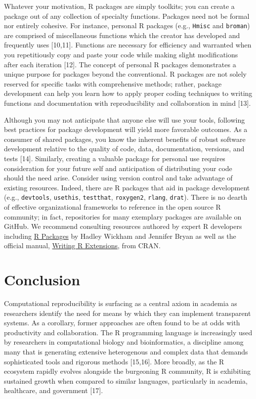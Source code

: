 \documentclass[10pt,letterpaper]{article}
\begin{document}
Whatever your motivation, R packages are simply toolkits; you can create
a package out of any collection of specialty functions. Packages need
not be formal nor entirely cohesive. For instance, personal R packages
(e.g., \texttt{Hmisc} and \texttt{broman}) are comprised of
miscellaneous functions which the creator has developed and frequently
uses {[}10,11{]}. Functions are necessary for efficiency and warranted
when you repetitiously copy and paste your code while making slight
modifications after each iteration {[}12{]}. The concept of personal R
packages demonstrates a unique purpose for packages beyond the
conventional. R packages are not solely reserved for specific tasks with
comprehensive methods; rather, package development can help you learn
how to apply proper coding techniques to writing functions and
documentation with reproducibility and collaboration in mind {[}13{]}.

Although you may not anticipate that anyone else will use your tools,
following best practices for package development will yield more
favorable outcomes. As a consumer of shared packages, you know the
inherent benefits of robust software development relative to the quality
of code, data, documentation, versions, and tests {[}14{]}. Similarly,
creating a valuable package for personal use requires consideration for
your future self and anticipation of distributing your code should the
need arise. Consider using version control and take advantage of
existing resources. Indeed, there are R packages that aid in package
development (e.g., \texttt{devtools}, \texttt{usethis},
\texttt{testthat}, \texttt{roxygen2}, \texttt{rlang}, \texttt{drat}).
There is no dearth of effective organizational frameworks to reference
in the open source R community; in fact, repositories for many exemplary
packages are available on GitHub. We recommend consulting resources
authored by expert R developers including \href{https://r-pkgs.org/}{R
Packages} by Hadley Wickham and Jennifer Bryan as well as the official
manual,
\href{https://cran.r-project.org/doc/manuals/r-release/R-exts.html}{Writing
R Extensions}, from CRAN.

\hypertarget{conclusion}{%
\section{Conclusion}\label{conclusion}}

Computational reproducibility is surfacing as a central axiom in
academia as researchers identify the need for means by which they can
implement transparent systems. As a corollary, former approaches are
often found to be at odds with productivity and collaboration. The R
programming language is increasingly used by researchers in
computational biology and bioinformatics, a discipline among many that
is generating extensive heterogenous and complex data that demands
sophisticated tools and rigorous methods {[}15,16{]}. More broadly, as
the R ecosystem rapidly evolves alongside the burgeoning R community, R
is exhibiting sustained growth when compared to similar languages,
particularly in academia, healthcare, and government {[}17{]}.
\end{document}
